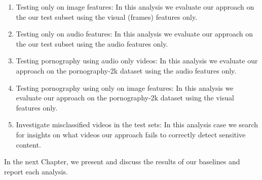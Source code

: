 \begin{enumerate}[start=0,label={(\bfseries E\arabic*):}]



\item Testing only on image features: In this analysis we evaluate our approach on the our test subset using the visual (frames) features only.

\item Testing only on audio features: In this analysis we evaluate our approach on the our test subset using the audio features only.


\item Testing pornography using audio only videos: In this analysis we evaluate our approach on the pornography-2k dataset using the audio features only.

\item Testing pornography using only on image features: In this analysis we evaluate our approach on the pornography-2k dataset using the visual features only.

\item Investigate misclassified videos in the test sets: In this analysis case we search for insights on what videos our approach fails to correctly detect sensitive content.
\end{enumerate}

In the next Chapter, we present and discuss the results of our baselines and report each analysis.